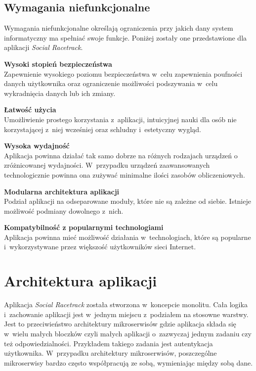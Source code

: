 \documentclass[../Kamil_Kowalewski_Main.tex]{subfiles}
\begin{document}
{{        \subsection{Wymagania niefunkcjonalne}
        \label{chapter4:dok_techniczna:wymagania:niefunkc} {
            Wymagania niefunkcjonalne określają ograniczenia przy jakich dany system
            informatyczny ma spełniać swoje funkcje. Poniżej zostały one
            przedstawione dla aplikacji \textit{Social Racetrack}.

            \noindent\textbf{Wysoki stopień bezpieczeństwa}\\
            \indent Zapewnienie wysokiego poziomu bezpieczeństwa w~celu zapewnienia
            poufności danych użytkownika oraz ograniczenie możliwości podszywania
            w~celu wykradnięcia danych lub ich zmiany.

            \noindent\textbf{Łatwość użycia}\\
            \indent Umożliwienie prostego korzystania z~aplikacji, intuicyjnej nauki
            dla osób nie korzystającej z~niej wcześniej oraz schludny i~estetyczny
            wygląd.

            \noindent\textbf{Wysoka wydajność}\\
            \indent Aplikacja powinna działać tak samo dobrze na różnych rodzajach
            urządzeń o zróżnicowanej wydajności. W~przypadku urządzeń zaawansowanych
            technologicznie powinna ona zużywać minimalne ilości zasobów obliczeniowych.

            \noindent\textbf{Modularna architektura aplikacji}\\
            \indent Podział aplikacji na odseparowane moduły, które nie są zależne od
            siebie. Istnieje możliwość podmiany dowolnego z~nich.

            \noindent\textbf{Kompatybilność z popularnymi technologiami}\\
            \indent Aplikacja powinna mieć możliwość działania
            w~technologiach, które są popularne i~wykorzystywane przez większość
            użytkowników sieci Internet.
        }
    }

    \section{Architektura aplikacji}
    \label{chapter4:dok_techniczna:architektura} {
        Aplikacja \textit{Social Racetrack} została stworzona w~koncepcie monolitu.
        Cała logika i~zachowanie aplikacji jest w~jednym miejscu z~podziałem na
        stosowne warstwy. Jest to przeciwieństwo architektury mikroserwisów gdzie
        aplikacja składa się w~wielu małych bloczków czyli małych aplikacji o~zazwyczaj
        jednym zadaniu czy też odpowiedzialności. Przykładem takiego zadania jest
        autentykacja użytkownika. W~przypadku architektury mikroserwisów,
        poszczególne mikroserwisy bardzo często współpracują ze sobą, wymieniając
        między sobą dane.

}}
\end{document}
